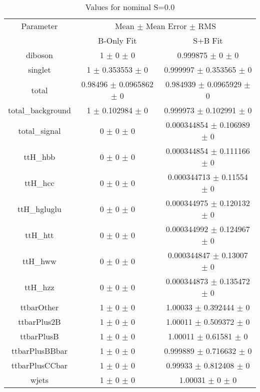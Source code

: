 \begin{table}
\centering
\caption{Values for nominal S=0.0}
\begin{tabular}{ccc}
\toprule
Parameter & \multicolumn{2}{c}{Mean $\pm$ Mean Error $\pm$ RMS}\\
 & B-Only Fit & S+B Fit\\
\midrule
diboson & \num{1} $\pm$ \num{0} $\pm$ \num{0} & \num{0.999875} $\pm$ \num{0} $\pm$ \num{0}\\
singlet & \num{1} $\pm$ \num{0.353553} $\pm$ \num{0} & \num{0.999997} $\pm$ \num{0.353565} $\pm$ \num{0}\\
total & \num{0.98496} $\pm$ \num{0.0965862} $\pm$ \num{0} & \num{0.984939} $\pm$ \num{0.0965929} $\pm$ \num{0}\\
total\_background & \num{1} $\pm$ \num{0.102984} $\pm$ \num{0} & \num{0.999973} $\pm$ \num{0.102991} $\pm$ \num{0}\\
total\_signal & \num{0} $\pm$ \num{0} $\pm$ \num{0} & \num{0.000344854} $\pm$ \num{0.106989} $\pm$ \num{0}\\
ttH\_hbb & \num{0} $\pm$ \num{0} $\pm$ \num{0} & \num{0.000344854} $\pm$ \num{0.111166} $\pm$ \num{0}\\
ttH\_hcc & \num{0} $\pm$ \num{0} $\pm$ \num{0} & \num{0.000344713} $\pm$ \num{0.11554} $\pm$ \num{0}\\
ttH\_hgluglu & \num{0} $\pm$ \num{0} $\pm$ \num{0} & \num{0.000344975} $\pm$ \num{0.120132} $\pm$ \num{0}\\
ttH\_htt & \num{0} $\pm$ \num{0} $\pm$ \num{0} & \num{0.000344992} $\pm$ \num{0.124967} $\pm$ \num{0}\\
ttH\_hww & \num{0} $\pm$ \num{0} $\pm$ \num{0} & \num{0.000344847} $\pm$ \num{0.13007} $\pm$ \num{0}\\
ttH\_hzz & \num{0} $\pm$ \num{0} $\pm$ \num{0} & \num{0.000344873} $\pm$ \num{0.135472} $\pm$ \num{0}\\
ttbarOther & \num{1} $\pm$ \num{0} $\pm$ \num{0} & \num{1.00033} $\pm$ \num{0.392444} $\pm$ \num{0}\\
ttbarPlus2B & \num{1} $\pm$ \num{0} $\pm$ \num{0} & \num{1.00011} $\pm$ \num{0.509372} $\pm$ \num{0}\\
ttbarPlusB & \num{1} $\pm$ \num{0} $\pm$ \num{0} & \num{1.00011} $\pm$ \num{0.61581} $\pm$ \num{0}\\
ttbarPlusBBbar & \num{1} $\pm$ \num{0} $\pm$ \num{0} & \num{0.999889} $\pm$ \num{0.716632} $\pm$ \num{0}\\
ttbarPlusCCbar & \num{1} $\pm$ \num{0} $\pm$ \num{0} & \num{0.99933} $\pm$ \num{0.812408} $\pm$ \num{0}\\
wjets & \num{1} $\pm$ \num{0} $\pm$ \num{0} & \num{1.00031} $\pm$ \num{0} $\pm$ \num{0}\\
\bottomrule
\end{tabular}
\end{table}